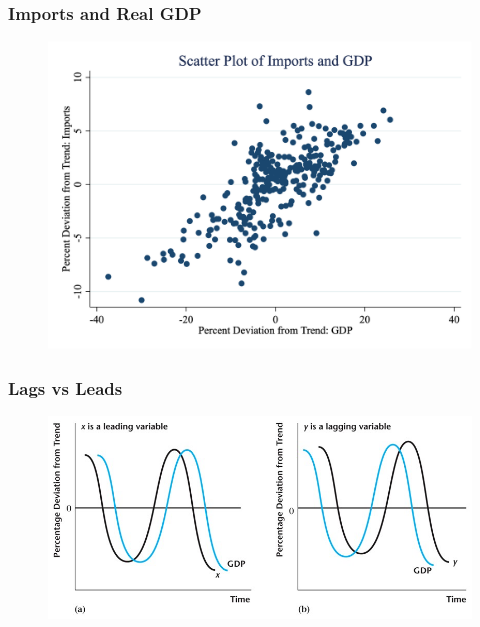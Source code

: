 \documentclass{beamer}
\begin{document}
\begin{frame}
\frametitle[alignment=center]{Imports and Real GDP}
\begin{figure}
\centering
\includegraphics[scale=0.25]{Figures/Fig_3pt6.png}
\end{figure}
\end{frame}

\begin{frame}
\frametitle[alignment=center]{Lags vs Leads}
\begin{figure}
\centering
\includegraphics[scale=0.5]{Figures/W_Fig_3pt7.png}
\end{figure}
\end{frame}
\end{document}
